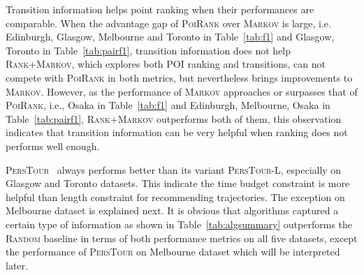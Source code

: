 Transition information helps point ranking when their performances are comparable.
When the advantage gap of \textsc{PoiRank} over \textsc{Markov} is large,
i.e. Edinburgh, Glasgow, Melbourne and Toronto in Table~\ref{tab:f1} and Glasgow, Toronto in Table~\ref{tab:pairf1},
transition information does not help \textsc{Rank+Markov}, which explores both POI ranking and transitions,
can not compete with \textsc{PoiRank} in both metrics, but nevertheless brings improvements to \textsc{Markov}.
However, as the performance of \textsc{Markov} approaches or surpasses that of \textsc{PoiRank},
i.e., Osaka in Table~\ref{tab:f1} and Edinburgh, Melbourne, Osaka in Table~\ref{tab:pairf1},
\textsc{Rank+Markov} outperforms both of them, this observation indicates that transition information can be very helpful when
ranking does not performs well enough.


\textsc{PersTour}~\cite{ijcai15} always performs better than its variant \textsc{PersTour-L},
especially on Glasgow and Toronto datasets.
This indicate the time budget constraint is more helpful than length constraint for recommending trajectories.
The exception on Melbourne dataset is explained next.
It is obvious that algorithms captured a certain type of information as shown in Table~\ref{tab:algsummary}
outperforms the \textsc{Random} baseline in terms of both performance metrics on all five datasets,
except the performance of \textsc{PersTour}\cite{ijcai15} on Melbourne dataset which will be interpreted later.
%

